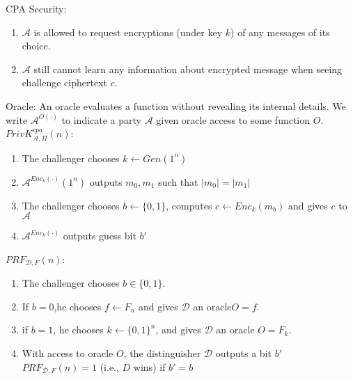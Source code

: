CPA Security:
\begin{enumerate}
  \item $\mathcal{A}$ is allowed to request encryptions (under key $k$) of any messages of its choice.
  \item $\mathcal{A}$ still cannot learn any information about encrypted message when seeing challenge ciphertext $c$.
\end{enumerate}
Oracle: An oracle evaluates a function without revealing its internal details.
We write $\mathcal{A}^{O(\cdot)}$ to indicate a party 
$\mathcal{A}$ given oracle access to some function $O$.
$PrivK^{cpa}_{\mathcal{A},\Pi}(n)$:
\begin{enumerate}
  \item The challenger chooses $k\leftarrow Gen(1^n)$
  \item $\mathcal{A}^{Enc_k(\cdot)}(1^n)$ outputs $m_0, m_1$ such that
  $|m_0|=|m_1|$
  \item The challenger chooses $b\leftarrow\{0,1\}$, 
  computes $c \leftarrow Enc_k(m_b)$ and gives $c$ to $\mathcal{A}$
  \item $\mathcal{A}^{Enc_k(\cdot)}$ outputs guess bit $b'$
\end{enumerate}
$PRF_{\mathcal{D},F}(n)$:
\begin{enumerate}
  \item The challenger chooses $b \in \{0,1\}$.
  \item If $b=0$,he chooses $f \leftarrow F_n$ and 
  gives $\mathcal{D}$ an oracle$ O=f$.
  \item if $b = 1$, he chooses $k \leftarrow \{0,1\}^n$, and 
  gives $\mathcal{D}$ an oracle $O = F_k$.
  \item With access to oracle $O$, the distinguisher $\mathcal{D}$ outputs 
  a bit $b'$ $PRF_{\mathcal{D},F}(n) = 1$ (i.e., $D$ wins) if $b' = b$
\end{enumerate}



